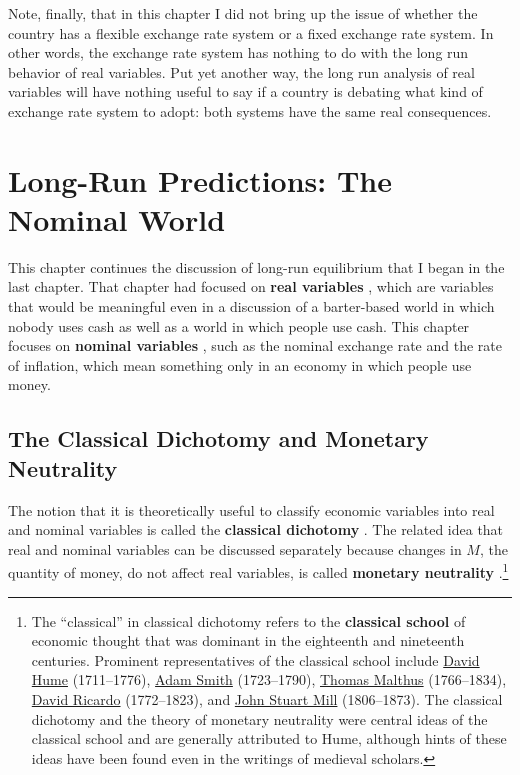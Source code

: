\documentclass[
  letterpaper,
]{book}
\theoremstyle{plain}
\theoremstyle{remark}
\begin{document}
Note, finally, that in this chapter I did not bring up the issue of
whether the country has a flexible exchange rate system or a fixed
exchange rate system. In other words, the exchange rate system has
nothing to do with the long run behavior of real variables. Put yet
another way, the long run analysis of real variables will have nothing
useful to say if a country is debating what kind of exchange rate system
to adopt: both systems have the same real consequences.


\chapter{Long-Run Predictions: The Nominal World}\label{sec-longnom}

This chapter continues the discussion of long-run equilibrium that I
began in the last chapter. That chapter had focused on \textbf{real
variables} , which are variables that would be
meaningful even in a discussion of a barter-based world in which nobody
uses cash as well as a world in which people use cash. This chapter
focuses on \textbf{nominal variables} , such as
the nominal exchange rate and the rate of inflation, which mean
something only in an economy in which people use money.

\section{The Classical Dichotomy and Monetary
Neutrality}\label{sec-monneutral}

The notion that it is theoretically useful to classify economic
variables into real and nominal variables is called the
\textbf{classical dichotomy} . The related
idea that real and nominal variables can be discussed separately because
changes in \(M\), the quantity of money, do not affect real variables,
is called \textbf{monetary neutrality}
.\footnote{The ``classical'' in classical
  dichotomy refers to the \textbf{classical school}
   of economic thought that was dominant in the
  eighteenth and nineteenth centuries. Prominent representatives of the
  classical school include
  \href{https://en.wikipedia.org/wiki/David_Hume}{David Hume}
  (1711--1776), \href{https://en.wikipedia.org/wiki/Adam_Smith}{Adam
  Smith} (1723--1790),
  \href{https://en.wikipedia.org/wiki/Thomas_Robert_Malthus}{Thomas
  Malthus} (1766--1834),
  \href{https://en.wikipedia.org/wiki/David_Ricardo}{David Ricardo}
  (1772--1823), and
  \href{https://en.wikipedia.org/wiki/John_Stuart_Mill}{John Stuart
  Mill} (1806--1873). The classical dichotomy and the theory of monetary
  neutrality were central ideas of the classical school and are
  generally attributed to Hume, although hints of these ideas have been
  found even in the writings of medieval scholars.}
\end{document}
